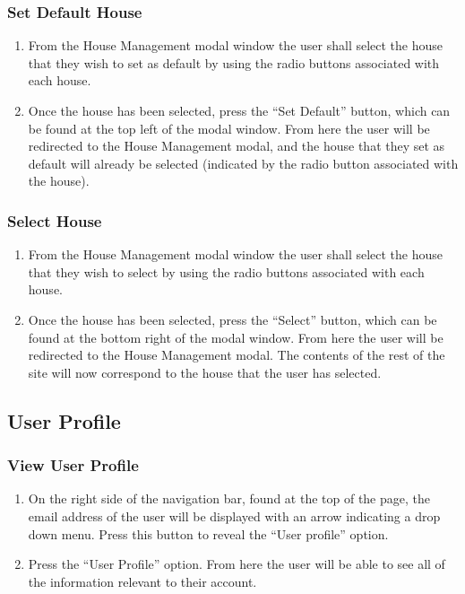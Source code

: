 \documentclass[12pt]{article}
\begin{document}
    \subsubsection{Set Default House}
    \begin{enumerate}
        \item From the House Management modal window the user shall select the house that they wish to set as default by using the radio buttons associated with each house.
        \item Once the house has been selected, press the ``Set Default'' button, which can be found at the top left of the modal window. From here the user will be redirected to the House Management modal, and the house that they set as default will already be selected (indicated by the radio button associated with the house).
    \end{enumerate}
    
    \subsubsection{Select House}
    \begin{enumerate}
        \item From the House Management modal window the user shall select the house that they wish to select by using the radio buttons associated with each house.
        \item Once the house has been selected, press the ``Select'' button, which can be found at the bottom right of the modal window. From here the user will be redirected to the House Management modal. The contents of the rest of the site will now correspond to the house that the user has selected.
    \end{enumerate}
    
    \subsection{User Profile} %
    \subsubsection{View User Profile}
    \begin{enumerate}
        \item On the right side of the navigation bar, found at the top of the page, the email address of the user will be displayed with an arrow indicating a drop down menu. Press this button to reveal the ``User profile'' option.
        \item Press the ``User Profile'' option. From here the user will be able to see all of the information relevant to their account.
    \end{enumerate}
    
\end{document}
